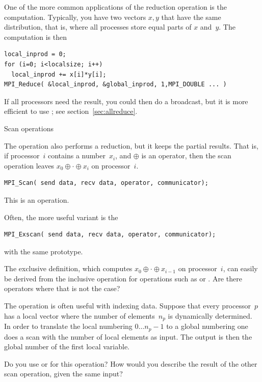 One of the more common applications of the reduction operation
is the  computation. Typically, you have two vectors $x,y$
that have the same distribution, that is,
where all processes store equal parts of $x$ and~$y$.
The computation is then
\begin{verbatim}
local_inprod = 0;
for (i=0; i<localsize; i++)
  local_inprod += x[i]*y[i];
MPI_Reduce( &local_inprod, &global_inprod, 1,MPI_DOUBLE ... ) 
\end{verbatim}
If all processors need the result, you could then do a broadcast,
but it is more efficient to use ; 
see section~\ref{sec:allreduce}.

 {Scan operations}

The  operation also performs a reduction, but it keeps 
the partial results. That is, if processor~$i$ contains a number~$x_i$, 
and $\oplus$ is an operator,
then the scan operation leaves $x_0\oplus\cdot\oplus x_i$ on processor~$i$.
\begin{verbatim}
MPI_Scan( send data, recv data, operator, communicator);
\end{verbatim}
This is an  operation. 

Often, the more useful variant is the 
\begin{verbatim}
MPI_Exscan( send data, recv data, operator, communicator);
\end{verbatim}
with the same prototype. 

\begin{exercise}
  The exclusive definition, which computes
  $x_0\oplus\cdot\oplus x_{i-1}$ on processor~$i$, can easily be derived
  from the inclusive operation for operations such as  or .
  Are there operators where that is not the case?
\end{exercise}

The  operation is often useful with indexing data. Suppose that
every processor~$p$ has a local vector where the number of elements~$n_p$ is dynamically 
determined. In order to translate the local numbering $0\ldots n_p-1$ to a global numbering
one does a scan with the number of local elements as input. The output is then the global 
number of the first local variable.

\begin{exercise}
  Do you use  or  for this operation? How
  would you describe the result of the other scan operation, given the
  same input?
\end{exercise}

